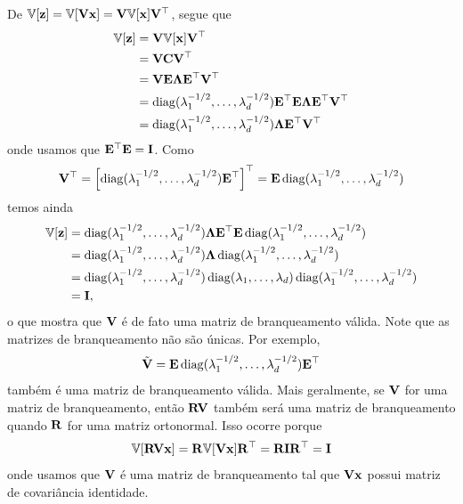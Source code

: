 \begin{exenumerate}
    \begin{solution}
        De $\mathbb{V}[\mathbf{z}] = \mathbb{V}[\mathbf{V}\mathbf{x}]= \mathbf{V} \mathbb{V}[\mathbf{x}] \mathbf{V}^\top$, segue que
        \begin{align}
            \mathbb{V}[\mathbf{z}] & =  \mathbf{V} \mathbb{V}[\mathbf{x}] \mathbf{V}^\top\\
            & =  \mathbf{V} \mathbf{C} \mathbf{V}^\top\\
            & =  \mathbf{V} \mathbf{E} \mathbf{\Lambda} \mathbf{E}^\top \mathbf{V}^\top\\
            & =   \operatorname{diag} (\lambda_1^{-1/2}, \ldots,
            \lambda_d^{-1/2}) \mathbf{E}^\top \mathbf{E} \mathbf{\Lambda} \mathbf{E}^\top  \mathbf{V}^\top\\
            & = \operatorname{diag} (\lambda_1^{-1/2}, \ldots,
            \lambda_d^{-1/2}) \mathbf{\Lambda} \mathbf{E}^\top \mathbf{V}^\top
        \end{align}
        onde usamos que $\mathbf{E}^\top \mathbf{E} = \mathbf{I}$. Como
        $$ \mathbf{V}^\top = \left[  \operatorname{diag} (\lambda_1^{-1/2}, \ldots, \lambda_d^{-1/2}) \mathbf{E}^\top \right]^\top = \mathbf{E}  \operatorname{diag} (\lambda_1^{-1/2}, \ldots, \lambda_d^{-1/2})$$
        temos ainda
        \begin{align}
            \mathbb{V}[\mathbf{z}] & = \operatorname{diag} (\lambda_1^{-1/2}, \ldots,
            \lambda_d^{-1/2}) \mathbf{\Lambda} \mathbf{E}^\top  \mathbf{E}  \operatorname{diag} (\lambda_1^{-1/2}, \ldots, \lambda_d^{-1/2})\\
            & =  \operatorname{diag} (\lambda_1^{-1/2}, \ldots,
            \lambda_d^{-1/2}) \mathbf{\Lambda} \operatorname{diag} (\lambda_1^{-1/2}, \ldots, \lambda_d^{-1/2})\\
            & =  \operatorname{diag} (\lambda_1^{-1/2}, \ldots,
            \lambda_d^{-1/2}) \operatorname{diag}(\lambda_1, \ldots, \lambda_d) \operatorname{diag} (\lambda_1^{-1/2}, \ldots, \lambda_d^{-1/2})\\
            & = \mathbf{I},
        \end{align}
        o que mostra que $\mathbf{V}$ \'e de fato uma matriz de branqueamento v\'alida. Note que as matrizes de branqueamento n\~ao s\~ao \'unicas. Por exemplo,
        $$ \tilde{\mathbf{V}} = \mathbf{E} \operatorname{diag} (\lambda_1^{-1/2}, \ldots,
        \lambda_d^{-1/2}) \mathbf{E}^\top$$ tamb\'em \'e uma matriz de branqueamento
        v\'alida. Mais geralmente, se $\mathbf{V}$ for uma matriz de branqueamento, ent\~ao $\mathbf{R} \mathbf{V}$ tamb\'em ser\'a
        uma matriz de branqueamento quando $\mathbf{R}$ for uma matriz
        ortonormal. Isso ocorre porque
        $$ \mathbb{V}[ \mathbf{R} \mathbf{V} \mathbf{x} ] = \mathbf{R} \mathbb{V}[\mathbf{V} \mathbf{x}] \mathbf{R}^\top = \mathbf{R} \mathbf{I} \mathbf{R}^{\top} = \mathbf{I} $$
        onde usamos que $\mathbf{V}$ \'e uma matriz de branqueamento tal que $\mathbf{V} \mathbf{x}$ possui matriz de covari\^ancia identidade.
        
        
    \end{solution}
    

\end{exenumerate}
